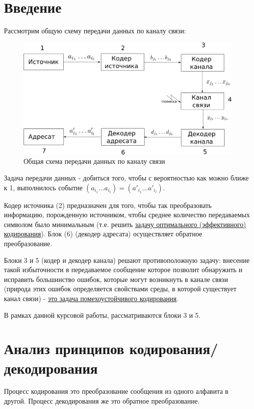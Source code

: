 \documentclass[14pt,a4paper,russian]{article}
\begin{document}
%

	\newpage

\renewcommand{\contentsname}{Оглавление}
\setcounter{page}{2}
\tableofcontents

\newpage
\section{Введение}
Рассмотрим общую схему передачи данных по каналу связи:
\begin{figure}[H]
	\centering
	\includegraphics[width=0.7\linewidth]{img/1}
	\caption{Общая схема передачи данных по каналу связи}
	\label{fig:1}
\end{figure}
Задача передачи данных - добиться того, чтобы с вероятностью как можно ближе к 1, выполнилось событие $(a_{i_1} \ldots a_{i_l}) = (a'_{i_1} \ldots a'_{i_l})$. 

Кодер источника (2) предназначен для того, чтобы так преобразовать информацию, порожденную источником, чтобы среднее количество передаваемых символом было минимальным (т.е. решить \uline{задачу оптимального (эффективного) кодирования}). Блок (6) (декодер адресата) осуществляет обратное преобразование.

Блоки 3 и 5 (кодер и декодер канала) решают противоположную задачу: внесение такой избыточности в передаваемое сообщение которое позволит обнаружить и исправить большинство ошибок, которые могут возникнуть в канале связи (природа этих ошибок определяется свойствами среды, в которой существует канал связи) - \uline{это задача помехоустойчивого кодирования}.

В рамках данной курсовой работы, рассматриваются блоки 3 и 5. 
\section{Анализ принципов кодирования/декодирования}
Процесс кодирования это преобразование сообщения из одного алфавита в другой. Процесс декодирования же это обратное преобразование.
\end{document}
